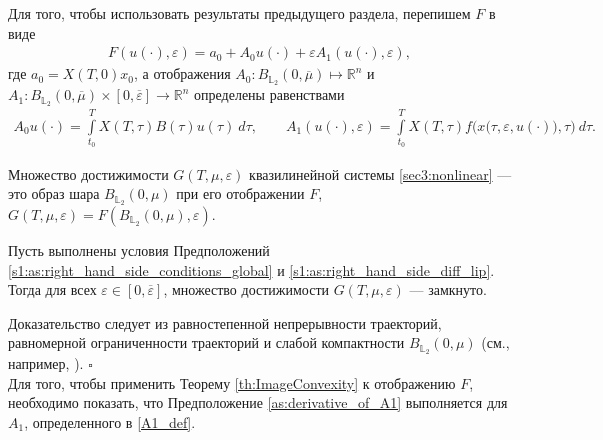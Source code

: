 \documentclass[../main.tex]{subfiles}
\begin{document}
Для того, чтобы использовать результаты предыдущего раздела, перепишем $F$ в виде
\begin{gather*}
 F(u(\cdot),\varepsilon) = a_0 + A_0 u(\cdot) + \varepsilon A_1(u(\cdot), \varepsilon), 
\end{gather*}
где $a_0 = X(T,0)x_0 $, а отображения $A_0: B_{\mathbb{L}_2}(0,\overline{\mu}) \mapsto \mathbb{R}^n$ и $A_1: B_{\mathbb{L}_2}(0,\overline{\mu}) \times [0,\overline{\varepsilon}] \to \mathbb{R}^n$ определены равенствами
\begin{gather}\label{A1_def}
 A_0 u(\cdot) = \int\limits_{t_0}^T X(T,\tau) B(\tau)u(\tau)\ d\tau, \qquad
 A_1(u(\cdot),\varepsilon) = \int\limits_{t_0}^T X(T,\tau) f\Big(x\big(\tau,\varepsilon, u(\cdot)\big),\tau\Big) \ d\tau.
\end{gather}

Множество достижимости $G(T,\mu,\varepsilon) $ квазилинейной системы \eqref{sec3:nonlinear} --- это образ шара $B_{\mathbb{L}_2}(0,\mu)$ при его отображении $F$, $G(T,\mu,\varepsilon) = F(B_{\mathbb{L}_2}(0,\mu),\varepsilon)$.

\begin{utv}\label{ReachableSetcloseness}
 Пусть выполнены условия Предположений \ref{s1:as:right_hand_side_conditions_global} и \ref{s1:as:right_hand_side_diff_lip}. 
Тогда для всех $\varepsilon\in [0,\overline{\varepsilon}]$, множество достижимости $G(T,\mu,\varepsilon) $ --- замкнуто.
\end{utv}
\doc 
Доказательство следует из равностепенной непрерывности траекторий, равномерной ограниченности траекторий и слабой компактности $B_{\mathbb{L}_2}(0,\mu)$ (см., например, \cite{GusZyk}).
\hfill$\square$\\[1ex]%

Для того, чтобы применить Теорему \ref{th:ImageConvexity} к отображению $F$, необходимо показать, что Предположение \ref{as:derivative_of_A1} выполняется для $A_1$, определенного в \eqref{A1_def}.
\end{document}

